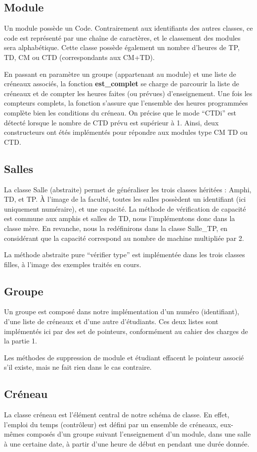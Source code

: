 \documentclass[a4paper,11pt]{report}
\begin{document}
	\subsection{Module}
		Un module possède un Code. Contrairement aux identifiants des autres classes, ce code est représenté par une chaîne de caractères, et le classement des modules sera alphabétique. Cette classe possède également un nombre d'heures de TP, TD, CM ou CTD (correspondants aux CM+TD).
		
		En passant en paramètre un groupe (appartenant au module) et une liste de créneaux associés, la fonction \textbf{est\_complet} se charge de parcourir la liste de créneaux et de compter les heures faites (ou prévues) d'enseignement. Une fois les compteurs complets, la fonction s'assure que l'ensemble des heures programmées complète bien les conditions du créneau.
		On précise que le mode ``CTDi'' est détecté lorsque le nombre de CTD prévu est supérieur à 1. Ainsi, deux constructeurs ont étés implémentés pour répondre aux modules type CM TD ou CTD.
	\subsection{Salles}
		La classe Salle (abstraite) permet de généraliser les trois classes héritées : Amphi, TD, et TP. À l'image de la faculté, toutes les salles possèdent un identifiant (ici uniquement numéraire), et une capacité.
		La méthode de vérification de capacité est commune aux amphis et salles de TD, nous l'implémentons donc dans la classe mère. En revanche, nous la redéfinirons dans la classe Salle\_TP, en considérant que la capacité correspond au nombre de machine multipliée par 2.
		
		La méthode abstraite pure ``vérifier type'' est implémentée dans les trois classes filles, à l'image des exemples traités en cours.
	\subsection{Groupe}
		Un groupe est composé dans notre implémentation d'un numéro (identifiant), d'une liste de créneaux et d'une autre d'étudiants. Ces deux listes sont implémentés ici par des set de pointeurs, conformément au cahier des charges de la partie 1. 
		
		Les méthodes de suppression de module et étudiant effacent le pointeur associé s'il existe, mais ne fait rien dans le cas contraire.
	\subsection{Créneau}
		La classe créneau est l'élément central de notre schéma de classe. En effet, l'emploi du temps (contrôleur) est défini par un ensemble de créneaux, eux-mêmes composés d'un groupe suivant l'enseignement d'un module, dans une salle à une certaine date, à partir d'une heure de début en pendant une durée donnée.
		
\end{document}
